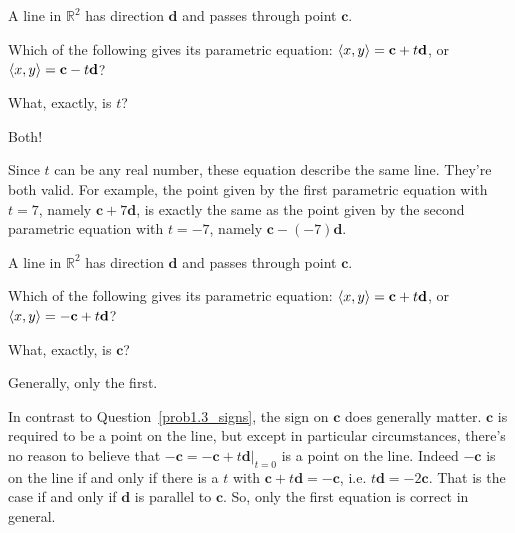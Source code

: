 

\subsection*{\Conceptual}

\begin{question}\label{prob1.3_signs}
A line in $\mathbb R^2$ has direction $\mathbf d$ and passes through point $\mathbf c$.

Which of the following gives its parametric equation: $\left< x,y\right> =\mathbf c + t\mathbf d $, or $\left< x,y\right> =\mathbf c - t\mathbf d $?

\end{question}
\begin{hint}
What, exactly, is $t$?
\end{hint}
\begin{answer}
Both!
\end{answer}
\begin{solution}
Since $t$ can be any real number, these equation describe the same line. They're both valid. For example, the point given by the first parametric 
equation with $t=7$, namely $\mathbf c + 7\mathbf d $, 
is exactly the same as the point given by the second  parametric equation 
with $t=-7$, namely $\mathbf c -(-7)\mathbf d $.
\end{solution}

\begin{question}
A line in $\mathbb R^2$ has direction $\mathbf d$ and passes through point $\mathbf c$.

Which of the following gives its parametric equation: $\left< x,y\right> =\mathbf c + t\mathbf d $, or $\left< x,y\right> =-\mathbf c +t \mathbf d$?

\end{question}
\begin{hint}
What, exactly, is $\mathbf c$?
\end{hint}
\begin{answer}
Generally, only the first.
\end{answer}
\begin{solution}
In contrast to Question~\ref{prob1.3_signs}, the sign on $\mathbf c$ does generally matter. $\mathbf c$ is required to be a point on the line, but except in particular circumstances, there's no reason to believe that 
$-\mathbf c =-\mathbf c +t\mathbf d\big|_{t=0}$ is a point on the line. 
Indeed $-\mathbf c$ is on the line if and only if there is a $t$ with
$\mathbf c + t\mathbf d = -\mathbf c$, i.e. $t\mathbf d = -2\mathbf c$.
That is the case if and only if $\mathbf d$ is parallel to $\mathbf c$.
So, only the first equation is correct in general.
\end{solution}

